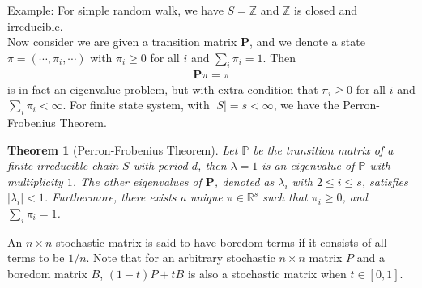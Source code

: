 \documentclass[11pt, onesided]{book}
\theoremstyle{break}
\theoremstyle{break}
\newtheorem{thm}{Theorem}[section]
\newcommand{\R}{\mathbb{R}}
\newcommand{\Z}{\mathbb{Z}}
\newcommand{\example}{\color{green}Example: \color{black}}
\begin{document}
\example For simple random walk, we have $S = \Z$ and $\Z$ is closed and irreducible. \\

Now consider we are given a transition matrix $\mathbf{P}$, and we denote a state $\pi = (\cdots, \pi_i , \cdots)$ with $\pi_i \geq 0$ for all $i$ and $\sum_{i}\pi_i = 1$. Then
\begin{align*}
\mathbf{P}\pi = \pi
\end{align*} 
is in fact an eigenvalue problem, but with extra condition that $\pi_i \geq 0$ for all $i$ and $\sum_i \pi_i < \infty$. For finite state system, with $|S| = s < \infty$, we have the Perron-Frobenius Theorem.
\begin{thm}[Perron-Frobenius Theorem]
Let $\mathbb{P}$ be the transition matrix of a finite irreducible chain $S$ with period $d$, then $\lambda = 1$ is an eigenvalue of $\mathbb{P}$ with multiplicity $1$. The other eigenvalues of $\mathbf{P}$, denoted as $\lambda_i$ with $2\leq i \leq s$, satisfies $|\lambda_i | < 1$. Furthermore, there exists a unique $\pi \in \R^s$ such that $\pi_i \geq 0$, and $\sum_i \pi_i = 1$. 
\end{thm}

An $n\times n$ stochastic matrix is said to have boredom terms if it consists of all terms to be $1/n$. Note that for an arbitrary stochastic $n\times n$ matrix $P$ and a boredom matrix $B$, $(1-t)P + tB$ is also a stochastic matrix when $t \in [0,1]$. 
\end{document}
